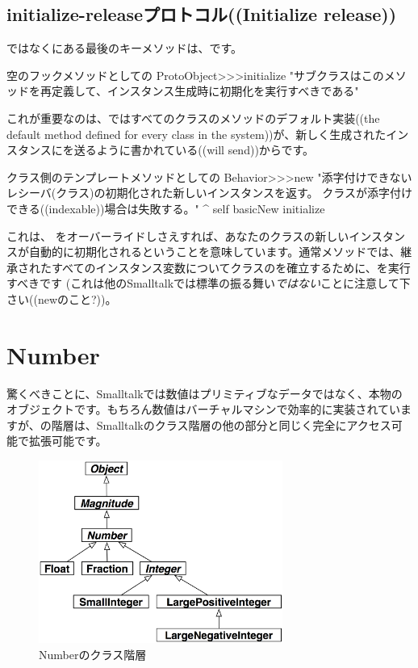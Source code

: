 \documentclass[a4paper,10pt,twoside]{book}
\begin{document}
\subsection{initialize-releaseプロトコル((Initialize release))}

ではなくにある最後のキーメソッドは、です。

\begin{method}{空のフックメソッドとしての}
ProtoObject>>>initialize
   "サブクラスはこのメソッドを再定義して、インスタンス生成時に初期化を実行すべきである"
\end{method}

これが重要なのは、\pharo ではすべてのクラスのメソッドのデフォルト実装((the default  method defined for every class in the system))が、新しく生成されたインスタンスにを送るように書かれている((will send))からです。

\begin{method}{クラス側のテンプレートメソッドとしての}
Behavior>>>new
    "添字付けできないレシーバ(クラス)の初期化された新しいインスタンスを返す。
    クラスが添字付けできる((indexable))場合は失敗する。"
    ^ self basicNew initialize
\end{method}

これは、 をオーバーライドしさえすれば、あなたのクラスの新しいインスタンスが自動的に初期化されるということを意味しています。通常メソッドでは、継承されたすべてのインスタンス変数についてクラスのを確立するために、を実行すべきです
(これは他のSmalltalkでは標準の振る舞い\emph{ではない}ことに注意して下さい((newのこと?))。

\section{Number}
驚くべきことに、Smalltalkでは数値はプリミティブなデータではなく、本物のオブジェクトです。もちろん数値はバーチャルマシンで効率的に実装されていますが、の階層は、Smalltalkのクラス階層の他の部分と同じく完全にアクセス可能で拡張可能です。

\begin{figure}[ht]
\centerline {\includegraphics[width=8cm]{NumberHierarchy}}
\caption{Numberのクラス階層 }
\end{figure}
\end{document}
